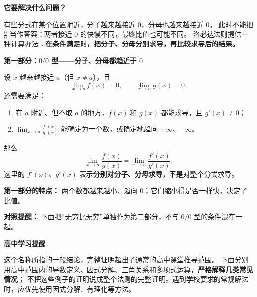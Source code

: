\begin{statementbox}

\textbf{\textcolor{CStatement}{它要解决什么问题？}}

有些分式在某个位置附近，分子越来越接近 $0$，分母也越来越接近 $0$。
此时不能把 $\frac00$ 当作答案：两者接近 $0$ 的快慢不同，最终比值也可能不同。
洛必达法则提供一种计算办法：\textbf{在条件满足时，把分子、分母分别求导，再比较求导后的结果。}

\medskip
\begin{center}\end{center}
\end{statementbox}
\clearpage
\begin{statementbox}
\textbf{\textcolor{CStatement}{第一部分：$0/0$ 型——分子、分母都趋近于 $0$}}


设 $x$ 越来越接近 $a$（但 $x\ne a$），且
\[
\lim_{x\to a}f(x)=0,\qquad \lim_{x\to a}g(x)=0.
\]
还需要满足：
\begin{enumerate}[leftmargin=*, itemsep=0.25em, topsep=0.25em]
    \item 在 $a$ 附近、但不取 $a$ 的地方，$f(x)$ 和 $g(x)$ 都能求导，且 $g'(x)\ne0$；
    \item $\displaystyle\lim_{x\to a}\frac{f'(x)}{g'(x)}$ 能确定为一个数，或确定地趋向 $+\infty$、$-\infty$。
\end{enumerate}
那么
\[
\boxed{\displaystyle
\lim_{x\to a}\frac{f(x)}{g(x)}
=\lim_{x\to a}\frac{f'(x)}{g'(x)}.}
\]
这里的 $f'(x)$、$g'(x)$ 表示\textbf{分别对分子、分母求导}，不是对整个分式求导。

\medskip
\textbf{第一部分的特点：} 两个数都越来越小、趋向 $0$；它们缩小得是否一样快，决定了比值。

\textbf{对照提醒：} 下面把“无穷比无穷”单独作为第二部分，不与 $0/0$ 型的条件混在一起。

\medskip
\textbf{\textcolor{CStatement}{高中学习提醒}}

这个名称所指的一般结论，完整证明超出了通常的高中课堂推导范围。
下面分别用高中范围内的导数定义、因式分解、三角关系和多项式运算，\textbf{严格解释几类常见情况}；
不把这些例子的证明说成整个法则的完整证明。遇到学校要求的常规解法时，应优先使用因式分解、有理化等方法。

\end{statementbox}

